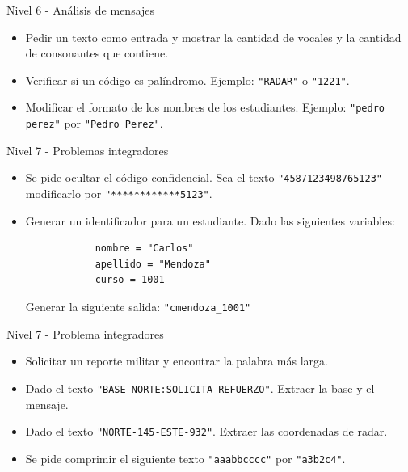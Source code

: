 \documentclass{beamer}
\begin{document}
    \begin{frame}[fragile, t]{Nivel 6 - Análisis de mensajes}
        \begin{itemize}
            \item Pedir un texto como entrada y mostrar la cantidad de vocales y la cantidad de consonantes que contiene.
            \item Verificar si un código es palíndromo. Ejemplo: \texttt{"RADAR"} o \texttt{"1221"}.
            \item Modificar el formato de los nombres de los estudiantes. Ejemplo: \texttt{"pedro perez"} por \texttt{"Pedro Perez"}.
        \end{itemize}
    \end{frame}

    \begin{frame}[fragile, t]{Nivel 7 - Problemas integradores}
        \begin{itemize}
            \item Se pide ocultar el código confidencial. Sea el texto \texttt{"4587123498765123"} modificarlo por \texttt{"************5123"}.
            \item Generar un identificador para un estudiante. Dado las siguientes variables: 
            \begin{verbatim}
            nombre = "Carlos"
            apellido = "Mendoza"
            curso = 1001
            \end{verbatim}
            Generar la siguiente salida: \texttt{"cmendoza_1001"}
        \end{itemize}
    \end{frame}

    \begin{frame}[fragile,t]{Nivel 7 - Problema integradores}
        \begin{itemize}
            \item Solicitar un reporte militar y encontrar la palabra más larga.
            \item Dado el texto \texttt{"BASE-NORTE:SOLICITA-REFUERZO"}. Extraer la base y el mensaje.
            \item Dado el texto \texttt{"NORTE-145-ESTE-932"}. Extraer las coordenadas de radar.
            \item Se pide comprimir el siguiente texto \texttt{"aaabbcccc"} por \texttt{"a3b2c4"}.
        \end{itemize}
    \end{frame}    
\end{document}
